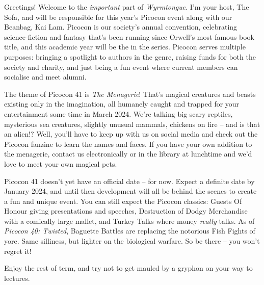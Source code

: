 Greetings! Welcome to the \textit{important} part of \textit{Wyrmtongue}. I’m your host, The Sofa, and will be responsible for this year’s Picocon event along with our Beanbag, Kai Lam. Picocon is our society’s annual convention, celebrating science-fiction and fantasy that’s been running since Orwell’s most famous book title, and this academic year will be the  in the series. Picocon serves multiple purposes: bringing a spotlight to authors in the genre, raising funds for both the society and charity, and just being a fun event where current members can socialise and meet alumni. 

The theme of Picocon 41 is \textit{The Menagerie}! That’s magical creatures and beasts existing only in the imagination, all humanely caught and trapped for your entertainment some time in March 2024. We’re talking big scary reptiles, mysterious sea creatures, slightly unusual mammals, chickens on fire – and is that an alien!? Well, you’ll have to keep up with us on social media and check out the Picocon fanzine to learn the names and faces. If you have your own addition to the menagerie, contact us electronically or in the library at lunchtime and we’d love to meet your own magical pets. 

Picocon 41 doesn’t yet have an official date – for now. Expect a definite date by January 2024, and until then development will all be behind the scenes to create a fun and unique event. You can still expect the Picocon classics: Guests Of Honour giving presentations and speeches, Destruction of Dodgy Merchandise with a comically large mallet, and Turkey Talks where money \textit{really} talks. As of \textit{Picocon 40: Twisted}, Baguette Battles are replacing the notorious Fish Fights of yore. Same silliness, but lighter on the biological warfare. So be there – you won’t regret it! 

Enjoy the rest of term, and try not to get mauled by a gryphon on your way to lectures. 
